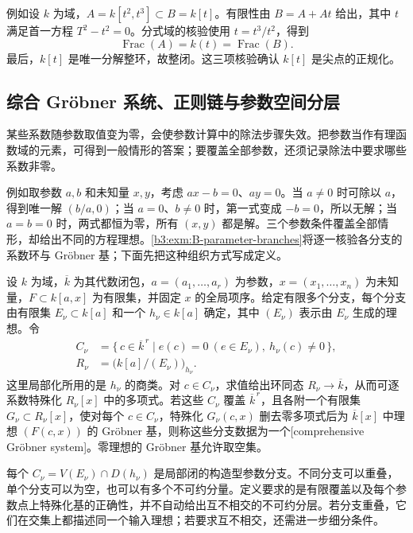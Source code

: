 \ProseParagraphBreak
例如设 \(k\) 为域，\(A=k[t^2,t^3]\subset B=k[t]\)。有限性由 \(B=A+At\) 给出，其中 \(t\) 满足首一方程 \(T^2-t^2=0\)。分式域的核验使用 \(t=t^3/t^2\)，得到
\[
	\operatorname{Frac}(A)=k(t)=\operatorname{Frac}(B).
\]
最后，\(k[t]\) 是唯一分解整环，故整闭。这三项核验确认 \(k[t]\) 是尖点的正规化。

\subsection{综合 Gröbner 系统、正则链与参数空间分层}
\label{b3:subsec:B03:02}

某些系数随参数取值变为零，会使参数计算中的除法步骤失效。把参数当作有理函数域的元素，可得到一般情形的答案；要覆盖全部参数，还须记录除法中要求哪些系数非零。

\ProseParagraphBreak
例如取参数 \(a,b\) 和未知量 \(x,y\)，考虑 \(ax-b=0\)、\(ay=0\)。当 \(a\ne0\) 时可除以 \(a\)，得到唯一解 \((b/a,0)\)；当 \(a=0\)、\(b\ne0\) 时，第一式变成 \(-b=0\)，所以无解；当 \(a=b=0\) 时，两式都恒为零，所有 \((x,y)\) 都是解。三个参数条件覆盖全部情形，却给出不同的方程理想。\cref{b3:exm:B-parameter-branches}将逐一核验各分支的系数环与 Gröbner 基；下面先把这种组织方式写成定义。

\begin{definition}\label{b3:def:B-comprehensive-system}
	设 \(k\) 为域，\(\overline k\) 为其代数闭包，\(a=(a_1,\ldots,a_r)\) 为参数，\(x=(x_1,\ldots,x_n)\) 为未知量，\(F\subset k[a,x]\) 为有限集，并固定 \(x\) 的全局项序。给定有限多个分支，每个分支由有限集 \(E_\nu\subset k[a]\) 和一个 \(h_\nu\in k[a]\) 确定，其中 \((E_\nu)\) 表示由 \(E_\nu\) 生成的理想。令
	\[
		\begin{aligned}
			C_\nu&=\{\,c\in\overline k^{\,r}\mid e(c)=0\ (e\in E_\nu),\ h_\nu(c)\ne0\,\},\\
			R_\nu&=\bigl(k[a]/(E_\nu)\bigr)_{h_\nu}.
		\end{aligned}
	\]
	这里局部化所用的是 \(h_\nu\) 的商类。对 \(c\in C_\nu\)，求值给出环同态 \(R_\nu\to\overline k\)，从而可逐系数特殊化 \(R_\nu[x]\) 中的多项式。若这些 \(C_\nu\) 覆盖 \(\overline k^{\,r}\)，且各附一个有限集 \(G_\nu\subset R_\nu[x]\)，使对每个 \(c\in C_\nu\)，特殊化 \(G_\nu(c,x)\) 删去零多项式后为 \(\overline k[x]\) 中理想 \((F(c,x))\) 的 Gröbner 基，则称这些分支数据为一个[comprehensive Gröbner system]。零理想的 Gröbner 基允许取空集。
\end{definition}

每个 \(C_\nu=V(E_\nu)\cap D(h_\nu)\) 是局部闭的构造型参数分支。不同分支可以重叠，单个分支可以为空，也可以有多个不可约分量。定义要求的是有限覆盖以及每个参数点上特殊化基的正确性，并不自动给出互不相交的不可约分层。若分支重叠，它们在交集上都描述同一个输入理想；若要求互不相交，还需进一步细分条件。

